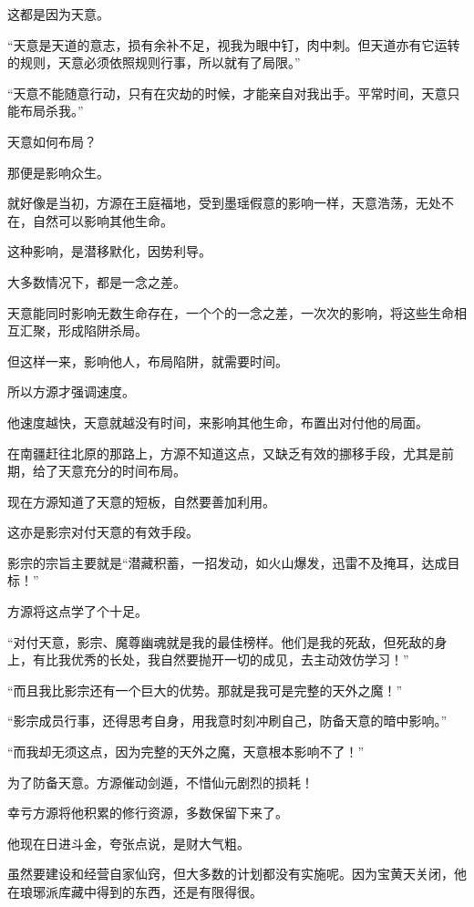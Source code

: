 \begin{this_body}
这都是因为天意。

“天意是天道的意志，损有余补不足，视我为眼中钉，肉中刺。但天道亦有它运转的规则，天意必须依照规则行事，所以就有了局限。”

“天意不能随意行动，只有在灾劫的时候，才能亲自对我出手。平常时间，天意只能布局杀我。”

天意如何布局？

那便是影响众生。

就好像是当初，方源在王庭福地，受到墨瑶假意的影响一样，天意浩荡，无处不在，自然可以影响其他生命。

这种影响，是潜移默化，因势利导。

大多数情况下，都是一念之差。

天意能同时影响无数生命存在，一个个的一念之差，一次次的影响，将这些生命相互汇聚，形成陷阱杀局。

但这样一来，影响他人，布局陷阱，就需要时间。

所以方源才强调速度。

他速度越快，天意就越没有时间，来影响其他生命，布置出对付他的局面。

在南疆赶往北原的那路上，方源不知道这点，又缺乏有效的挪移手段，尤其是前期，给了天意充分的时间布局。

现在方源知道了天意的短板，自然要善加利用。

这亦是影宗对付天意的有效手段。

影宗的宗旨主要就是“潜藏积蓄，一招发动，如火山爆发，迅雷不及掩耳，达成目标！”

方源将这点学了个十足。

“对付天意，影宗、魔尊幽魂就是我的最佳榜样。他们是我的死敌，但死敌的身上，有比我优秀的长处，我自然要抛开一切的成见，去主动效仿学习！”

“而且我比影宗还有一个巨大的优势。那就是我可是完整的天外之魔！”

“影宗成员行事，还得思考自身，用我意时刻冲刷自己，防备天意的暗中影响。”

“而我却无须这点，因为完整的天外之魔，天意根本影响不了！”

为了防备天意。方源催动剑遁，不惜仙元剧烈的损耗！

幸亏方源将他积累的修行资源，多数保留下来了。

他现在日进斗金，夸张点说，是财大气粗。

虽然要建设和经营自家仙窍，但大多数的计划都没有实施呢。因为宝黄天关闭，他在琅琊派库藏中得到的东西，还是有限得很。


\end{this_body}
